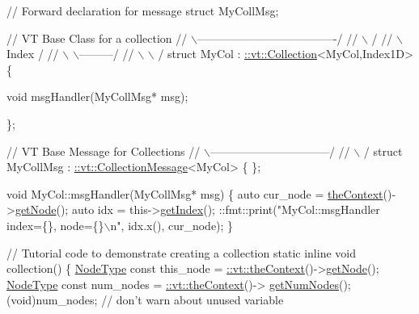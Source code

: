 \begin{DoxyCodeInclude}
\textcolor{comment}{// Forward declaration for message}
\textcolor{keyword}{struct }MyCollMsg;

\textcolor{comment}{//               VT Base Class for a collection}
\textcolor{comment}{//         \(\backslash\)-------------------------------------/}
\textcolor{comment}{//          \(\backslash\)                                   /}
\textcolor{comment}{//           \(\backslash\)                         Index   /}
\textcolor{comment}{//            \(\backslash\)                     \(\backslash\)---------/}
\textcolor{comment}{//             \(\backslash\)                     \(\backslash\)       /}
\textcolor{keyword}{struct }MyCol : \hyperlink{structvt_1_1vrt_1_1collection_1_1_collection}{::vt::Collection}<MyCol,Index1D> \{

  \textcolor{keywordtype}{void} msgHandler(MyCollMsg* msg);

\};

\textcolor{comment}{//                 VT Base Message for Collections}
\textcolor{comment}{//               \(\backslash\)--------------------------------/}
\textcolor{comment}{//                \(\backslash\)                              /}
\textcolor{keyword}{struct }MyCollMsg : \hyperlink{structvt_1_1vrt_1_1collection_1_1_collection_message}{::vt::CollectionMessage}<MyCol> \{ \};

\textcolor{keywordtype}{void} MyCol::msgHandler(MyCollMsg* msg) \{
  \textcolor{keyword}{auto} cur\_node = \hyperlink{namespacevt_a26551fe0e6e6a1371111df5b12c7e92c}{theContext}()->\hyperlink{structvt_1_1ctx_1_1_context_a0d52c263ce8516546a67443d9a86fa5f}{getNode}();
  \textcolor{keyword}{auto} idx = this->\hyperlink{namespacecheckpoint_1_1dispatch_1_1typeregistry_aa75ef84e9b63a687784360ded2d56fe4}{getIndex}();
  ::fmt::print(\textcolor{stringliteral}{"MyCol::msgHandler index=\{\}, node=\{\}\(\backslash\)n"}, idx.x(), cur\_node);
\}

\textcolor{comment}{// Tutorial code to demonstrate creating a collection}
\textcolor{keyword}{static} \textcolor{keyword}{inline} \textcolor{keywordtype}{void} collection() \{
  \hyperlink{namespacevt_a866da9d0efc19c0a1ce79e9e492f47e2}{NodeType} \textcolor{keyword}{const} this\_node = \hyperlink{namespacevt_a26551fe0e6e6a1371111df5b12c7e92c}{::vt::theContext}()->\hyperlink{structvt_1_1ctx_1_1_context_a0d52c263ce8516546a67443d9a86fa5f}{getNode}();
  \hyperlink{namespacevt_a866da9d0efc19c0a1ce79e9e492f47e2}{NodeType} \textcolor{keyword}{const} num\_nodes = \hyperlink{namespacevt_a26551fe0e6e6a1371111df5b12c7e92c}{::vt::theContext}()->
      \hyperlink{structvt_1_1ctx_1_1_context_a7f41071aadf6d5fa9e1b6c703c5ff19d}{getNumNodes}();
  (void)num\_nodes;  \textcolor{comment}{// don't warn about unused variable}


\end{DoxyCodeInclude}

